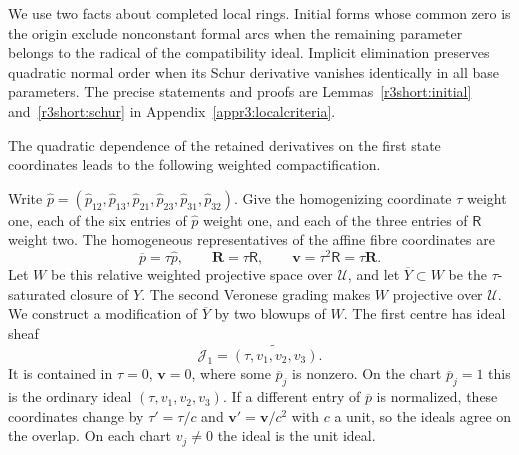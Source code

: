 \documentclass[11pt,a4paper]{article}
\numberwithin{equation}{section}
\theoremstyle{plain}
\theoremstyle{definition}
\theoremstyle{remark}
\begin{document}
We use two facts about completed local rings. Initial forms whose common zero is the origin exclude
nonconstant formal arcs when the remaining parameter belongs to the
radical of the compatibility ideal. Implicit elimination preserves quadratic
normal order when its Schur derivative vanishes identically in all
base parameters. The precise statements and proofs are
Lemmas~\ref{r3short:initial} and~\ref{r3short:schur} in
Appendix~\ref{appr3:localcriteria}.

The quadratic dependence of the retained derivatives on the first
state coordinates leads to the following weighted compactification.

Write $\widehat p=(\widehat p_{12},\widehat p_{13},\widehat p_{21},\widehat p_{23},\widehat p_{31},\widehat p_{32})$.
Give the homogenizing coordinate $\tau$ weight one, each of the six
entries of $\widehat p$ weight one, and each of the three entries of $\mathsf R$
weight two. The homogeneous representatives of the affine fibre coordinates are
\[
 \overline p=\tau\widehat p,\qquad
 \boldsymbol R=\tau\mathsf R,\qquad
 \boldsymbol v=\tau^2\mathsf R=\tau\boldsymbol R.
\]
Let $W$ be this relative weighted projective space over $\mathscr U$,
and let $\overline Y\subset W$ be the $\tau$-saturated closure of $Y$.
The second Veronese grading makes $W$ projective over $\mathscr U$.
We construct a modification of $\overline Y$ by two blowups of $W$.
The first centre has ideal sheaf
\[
 \mathcal J_1=\widetilde{(\tau,v_1,v_2,v_3)}.
\]
It is contained in $\tau=0$, $\boldsymbol v=0$, where some
$\overline p_j$ is nonzero. On the chart $\overline p_j=1$ this
is the ordinary ideal $(\tau,v_1,v_2,v_3)$.
If a different entry of $\overline p$ is normalized, these coordinates
change by $\tau'=\tau/c$ and $\boldsymbol v'=\boldsymbol v/c^2$
with $c$ a unit, so the ideals agree on the overlap.
On each chart $v_j\ne0$ the ideal is the unit ideal.
\end{document}
